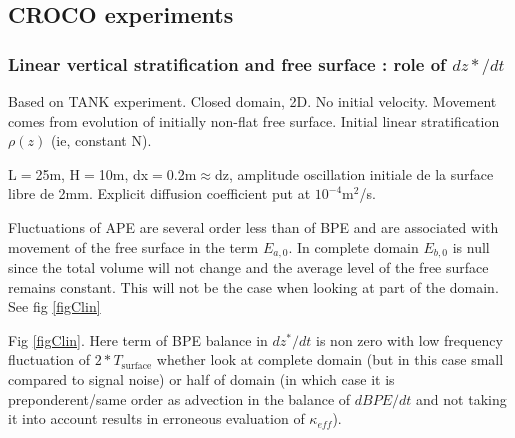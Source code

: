 


\subsection{CROCO experiments}

\subsubsection{Linear vertical stratification and free surface : role of $dz*/dt$}
Based on TANK experiment. Closed domain, 2D. No initial velocity. Movement comes from evolution of initially non-flat free surface. Initial linear stratification $\rho(z)$ (ie, constant N).

L$=$25m, H$=$10m, dx$=$0.2m$\approx$dz, amplitude oscillation initiale de la surface libre de 2mm. Explicit diffusion coefficient put at $10^{-4}$m$^2$/s.


Fluctuations of APE are several order less than of BPE and are associated with movement of the free surface in the term $E_{a,0}$. In complete domain $E_{b,0}$ is null since the total volume will not change and the average level of the free surface remains constant. This will not be the case when looking at part of the domain. See fig \ref{figClin}


Fig \ref{figClin}. Here term of BPE balance in $dz^*/dt$ is non zero with low frequency fluctuation of $2*T_{\text{surface}}$ whether look at complete domain (but in this case small compared to signal noise) or half of domain (in which case it is preponderent/same order as advection in the balance of $dBPE/dt$ and not taking it into account results in erroneous evaluation of $\kappa_{eff}$).


